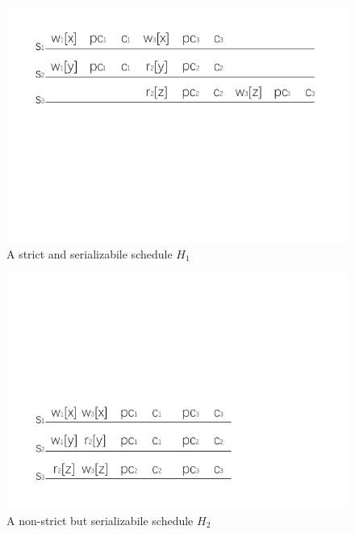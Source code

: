 \documentclass[conference]{IEEEtran}
\begin{document}
\begin{figure}[htbp]
  \centerline{\includegraphics[scale=1]{figure/schedule_strict.pdf}}
  \caption{A strict and serializabile schedule ${H_1}$}
  \label{fig:strict_example}
\end{figure}

\begin{figure}[htbp]
  \centerline{\includegraphics[scale=1]{figure/schedule_non_strict.pdf}}
  \caption{A non-strict but serializabile schedule ${H_2}$}
  \label{fig:non_strict_example}
\end{figure}
\end{document}
